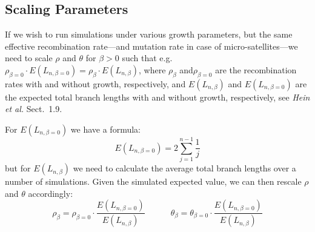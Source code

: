 \documentclass{manual}
\begin{document}
\subsection{Scaling Parameters}
\label{sec:scaling-parameters}

If we wish to run simulations under various growth parameters, but the
same effective recombination rate---and mutation rate in case of
micro-satellites---we need to scale $\rho$ and $\theta$ for $\beta>0$
such that e.g.\ 
$\rho_{\beta=0}\cdot{}E(L_{n,\beta=0})=\rho_\beta\cdot{}E(L_{n,\beta})$,
where $\rho_\beta$ and$\rho_{\beta=0}$ are the recombination rates
with and without growth, respectively, and $E(L_{n,\beta})$ and
$E(L_{n,\beta=0})$ are the expected total branch lengths with and
without growth, respectively, see \emph{Hein et al.} Sect.~1.9.

For $E(L_{n,\beta=0})$ we have a formula:
\begin{equation}
  \label{eq:1}
  E(L_{n,\beta=0})=2\sum_{j=1}^{n-1}\frac{1}{j}
\end{equation}
but for $E(L_{n,\beta})$ we need to calculate the average total branch
lengths over a number of simulations.  Given the simulated expected
value, we can then rescale $\rho$ and $\theta$ accordingly: 
\[\rho_\beta=\rho_{\beta=0}\cdot\frac{E(L_{n,\beta=0})}{E(L_{n,\beta})}
  \quad\quad\quad
  \theta_\beta=\theta_{\beta=0}\cdot\frac{E(L_{n,\beta=0})}{E(L_{n,\beta})}
\]
\end{document}
